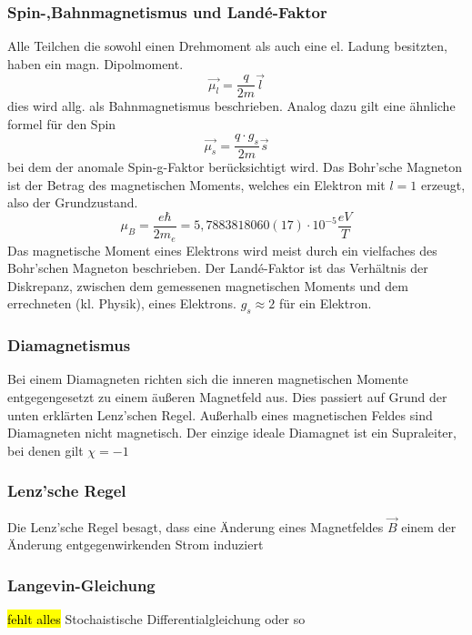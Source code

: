         \subsubsection*{Spin-,Bahnmagnetismus und Landé-Faktor}
            Alle Teilchen die sowohl einen Drehmoment als auch eine el. Ladung besitzten, haben ein magn. Dipolmoment.
            \begin{equation}
                \vec{\mu_l} = \frac{q}{2m} \vec{l}
            \end{equation}
            dies wird allg. als Bahnmagnetismus beschrieben. Analog dazu gilt eine ähnliche formel für den Spin
            \begin{equation}
                \vec{\mu_s} = \frac{q\cdot g_s}{2m} \vec{s}
            \end{equation}
            bei dem der anomale Spin-g-Faktor berücksichtigt wird.
            Das Bohr'sche Magneton ist der Betrag des magnetischen Moments, welches ein Elektron
            mit $l=1$ erzeugt, also der Grundzustand.
            \begin{equation}
                \mu_B = \frac{e \hbar}{2 m_e} = 5,7883818060(17)\cdot 10^{-5} \frac{eV}{T}
            \end{equation}
            Das magnetische Moment eines Elektrons wird meist durch ein vielfaches des Bohr'schen
            Magneton beschrieben.
            Der Landé-Faktor ist das Verhältnis der Diskrepanz, zwischen dem gemessenen magnetischen Moments
            und dem errechneten (kl. Physik), eines Elektrons. $g_s \approx 2$ für ein Elektron.
        \subsubsection*{Diamagnetismus}
            Bei einem Diamagneten richten sich die inneren magnetischen Momente entgegengesetzt
            zu einem äußeren Magnetfeld aus. Dies passiert auf Grund der unten erklärten Lenz'schen Regel.
            Außerhalb eines magnetischen Feldes sind Diamagneten
            nicht magnetisch. Der einzige ideale Diamagnet ist ein Supraleiter, bei denen gilt $\chi = -1$           
        \subsubsection*{Lenz'sche Regel}    
            Die Lenz'sche Regel besagt, dass eine Änderung eines Magnetfeldes $\vec{B}$ einem der Änderung
            entgegenwirkenden Strom induziert
        \subsubsection*{Langevin-Gleichung}
            \hl{fehlt alles}
            Stochaistische Differentialgleichung oder so 
